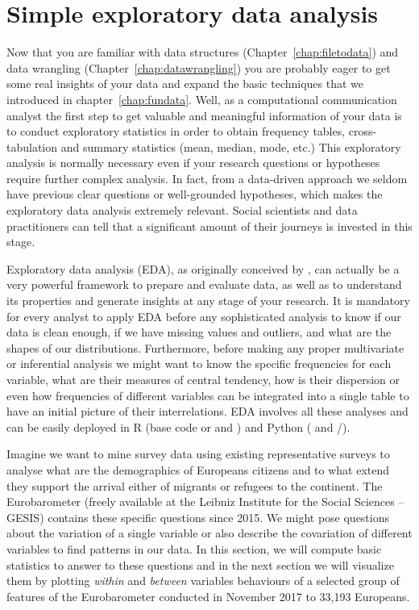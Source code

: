 \section{Simple exploratory data analysis}

Now that you are familiar with data structures (Chapter~\ref{chap:filetodata}) and data wrangling (Chapter~\ref{chap:datawrangling}) you are probably eager to get some real insights of your data and expand the basic techniques that we introduced in chapter~\ref{chap:fundata}. Well, as a computational communication analyst the first step to get valuable and meaningful information of your data is to conduct exploratory statistics in order to obtain frequency tables, cross-tabulation and summary statistics (mean, median, mode, etc.)  This exploratory analysis is normally necessary even if your research questions or hypotheses require further complex analysis. In fact, from a data-driven approach we seldom have previous clear questions or well-grounded hypotheses, which makes the exploratory data analysis extremely relevant. Social scientists and data practitioners can tell that a significant amount of their journeys is invested in this stage.

Exploratory data analysis (EDA), as originally conceived by \cite{tukey1977exploratory}, can actually be a very powerful framework to prepare and evaluate data, as well as to understand its properties and generate insights at any stage of your research.  It is mandatory for every analyst to apply EDA before any sophisticated analysis to know if our data is clean enough, if we have missing values and outliers, and what are the shapes of our distributions. Furthermore, before making any proper multivariate or inferential analysis we might want to know the specific frequencies for each variable, what are their measures of central tendency, how is their dispersion or even how frequencies of different variables can be integrated into a single table to have an initial picture of their interrelations. EDA involves all these analyses and can be easily deployed in R (base code or and ) and Python ( and /).

Imagine we want to mine survey data using existing representative surveys to analyse what are the demographics of Europeans citizens and to what extend they support the arrival either of migrants or refugees to the continent. The Eurobarometer (freely available at the Leibniz Institute for the Social Sciences – GESIS) contains these specific questions since 2015. We might pose questions about the variation of a single variable or also describe the covariation of different variables to find patterns in our data. In this section, we will compute basic statistics to answer to these questions and in the next section we will visualize them by plotting \textit{within} and \textit{between} variables behaviours of a selected group of features of the Eurobarometer conducted in November 2017 to 33,193 Europeans. 

